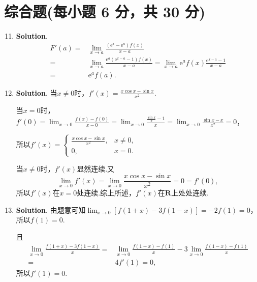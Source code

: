 \documentclass[../main.tex]{subfiles}
\begin{document}
\section{综合题(每小题 6 分，共 30 分)}
\begin{enumerate}
    \setcounter{enumi}{10}
    \item \textbf{Solution}.
          \[
              \begin{aligned}
                  F'(a)= {} & \lim_{x\to a}\frac{(\mathrm{e}^x-\mathrm{e}^a)f(x)}{x-a}                                                                     \\
                  = {}      & \lim_{x\to a}\frac{\mathrm{e}^a(\mathrm{e}^{x-a}-1)f(x)}{x-a}=\lim_{x\to a}\mathrm{e}^{a} f(x)\frac{\mathrm{e}^{x-a}-1}{x-a} \\
                  = {}      & \mathrm{e}^{a} f(a).
              \end{aligned}
          \]

    \item \textbf{Solution}. 当$x\neq0$时，$f'(x)=\frac{x\cos x-\sin x}{x^{2}}$.

          当$x=0$时，$f'(0)=\lim_{x\to0}\frac{f(x)-f(0)}{x-0}=\lim_{x\to0}\frac{\frac{\sin
                      x}{x}-1}{x}=\lim_{x\to0}\frac{\sin x-x}{x^{2}}=0$，

          所以$f'(x)=
              \begin{cases}
                  \frac{x\cos x-\sin x}{x^2}, & x\neq0, \\
                  0,                          & x=0.
              \end{cases}$

          当$x\neq0$时，$f'(x)$显然连续.又
          \[
              \lim_{x\to0}f'(x)=\lim_{x\to0}\frac{x\cos x-\sin x}{x^{2}}=0=f'(0),
          \]
          所以$f'(x)$在$x=0$处连续.综上所述，$f'(x)$在$\mathbf{R}$上处处连续.

    \item \textbf{Solution}. 由题意可知$\lim_{x\to0}\left[f(1+x)-3f(1-x)\right
              ]=-2f(1)=0$，所以$f(1)=0$.

          且
          \[
              \begin{aligned}
                  \lim_{x\to0}\frac{f(1+x)-3f(1-x)}{x}= {} & \lim_{x\to0}\frac{f(1+x)-f(1)}{x}-3\lim_{x\to0}\frac{f(1-x)-f(1)}{x} \\
                  ={}                                      & 4f'(1)=0,
              \end{aligned}
          \]
          所以$f'(1)=0$.


\end{enumerate}
\end{document}
